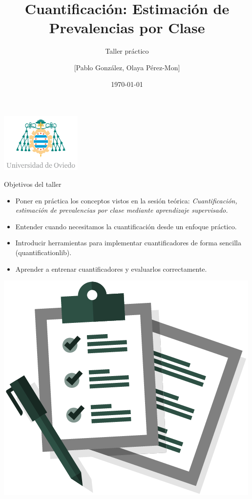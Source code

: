 \documentclass{beamer}
\title{Cuantificación: Estimación de Prevalencias por Clase}
\subtitle{Taller práctico}
\author{[Pablo González, Olaya Pérez-Mon]}
\institute{[Universidad de Oviedo]}
\date{\today}
\begin{document}
\begin{frame}
    \titlepage
    \vfill
    \centering
    \includegraphics[width=0.3\textwidth]{images/logo.png} %
\end{frame}

\begin{frame}{Objetivos del taller}
\begin{itemize}
    \item Poner en práctica los conceptos vistos en la sesión teórica: \textit{Cuantificación, estimación de prevalencias por clase mediante aprendizaje supervisado.}
    \item Entender cuando necesitamos la cuantificación desde un enfoque práctico.
    \item Introducir herramientas para implementar cuantificadores de forma sencilla (quantificationlib).
    \item Aprender a entrenar cuantificadores y evaluarlos correctamente.
\end{itemize}
\centering
\includegraphics[scale=0.2]{images/objetivos.png}
\end{frame}
\end{document}
